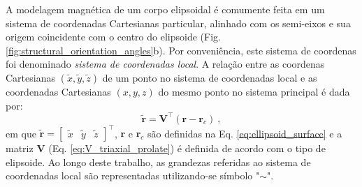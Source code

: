 A modelagem magnética de um corpo elipsoidal é comumente feita em um sistema de coordenadas Cartesianas particular, alinhado com os semi-eixos e sua origem coincidente com o centro do elipsoide (Fig. \ref{fig:structural_orientation_angles}b). Por conveniência, este sistema de coordenas foi denominado \textit{sistema de coordenadas local}.
A relação entre as coordenas Cartesianas $(\tilde{x}, \tilde{y}, \tilde{z})$
de um ponto no sistema de coordenadas local e as coordenadas Cartesianas $(x, y, z)$ do mesmo ponto no sistema principal é dada por:
\begin{equation}
\tilde{\mathbf{r}} = \mathbf{V}^{\top} \left( \mathbf{r} - \mathbf{r}_{c} \right) \: ,
\label{eq:coord_transformation}
\end{equation}
em que 
$\tilde{\mathbf{r}} = [\begin{array}{ccc} \tilde{x} & 
\tilde{y} & 
\tilde{z} \end{array} ]^{\top}$,
$\mathbf{r}$ e $\mathbf{r}_{c}$
são definidas na Eq. \ref{eq:ellipsoid_surface} e a matriz $\mathbf{V}$  (Eq. \ref{eq:V_triaxial_prolate})
é definida de acordo com o tipo de elipsoide. Ao longo deste trabalho, as grandezas referidas ao sistema de coordenadas local são representadas utilizando-se símbolo "$\sim$".

